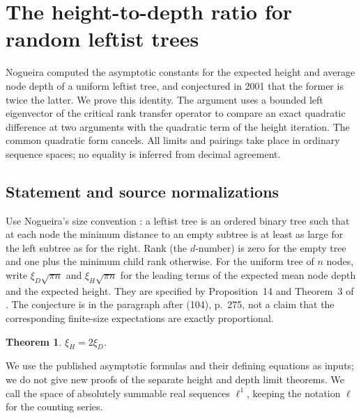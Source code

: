 \documentclass[11pt,a4paper]{article}
\numberwithin{equation}{section}
\newtheorem{theorem}{Theorem}[section]
\theoremstyle{definition}
\theoremstyle{remark}
\newenvironment{sectionabstract}{\par\smallskip\begingroup\small\noindent}{\par\endgroup\medskip}
\begin{document}
\begingroup
\newcommand{\pair}[2]{\langle #1,#2\rangle}
\section{\texorpdfstring{The height-to-depth ratio for random leftist trees}{The height-to-depth ratio for random leftist trees}}\label{section:r49taisho}
\par\medskip


\begin{sectionabstract}
Nogueira computed the asymptotic constants for the expected height and average node depth of a uniform leftist tree, and conjectured in 2001 that the former is twice the latter. We prove this identity. The argument uses a bounded left eigenvector of the critical rank transfer operator to compare an exact quadratic difference at two arguments with the quadratic term of the height iteration. The common quadratic form cancels. All limits and pairings take place in ordinary sequence spaces; no equality is inferred from decimal agreement.
\end{sectionabstract}

\subsection{Statement and source normalizations}
Use Nogueira's size convention \cite{r49taisho:N}: a leftist tree is an ordered binary tree such that at each node the minimum distance to an empty subtree is at least as large for the left subtree as for the right. Rank (the $d$-number) is zero for the empty tree and one plus the minimum child rank otherwise. For the uniform tree of $n$ nodes, write $\xi_D\sqrt{\pi n}$ and $\xi_H\sqrt{\pi n}$ for the leading terms of the expected mean node depth and the expected height. They are specified by Proposition~14 and Theorem~3 of \cite{r49taisho:N}. The conjecture is in the paragraph after (104), p.~275, not a claim that the corresponding finite-size expectations are exactly proportional.
\begin{theorem} $\xi_H=2\xi_D$. \end{theorem}
We use the published asymptotic formulas and their defining equations as inputs; we do not give new proofs of the separate height and depth limit theorems. We call the space of absolutely summable real sequences $\ell^1$, keeping the notation $\ell$ for the counting series.
\end{document}
